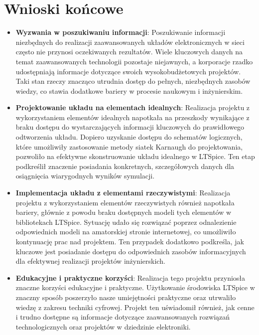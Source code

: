 \documentclass{article}
\begin{document}
\section{Wnioski końcowe}
\begin{itemize}
    \item \textbf{Wyzwania w poszukiwaniu informacji}:
    Poszukiwanie informacji niezbędnych do realizacji zaawansowanych układów elektronicznych w sieci często nie przynosi oczekiwanych rezultatów. Wiele kluczowych danych na temat zaawansowanych technologii pozostaje niejawnych, a korporacje rzadko udostępniają informacje dotyczące swoich wysokobudżetowych projektów. Taki stan rzeczy znacząco utrudnia dostęp do pełnych, niezbędnych zasobów wiedzy, co stawia dodatkowe bariery w procesie naukowym i inżynierskim.
    \item \textbf{Projektowanie układu na elementach idealnych}:
    Realizacja projektu z wykorzystaniem elementów idealnych napotkała na przeszkody wynikające z braku dostępu do wystarczających informacji kluczowych do prawidłowego odtworzenia układu. Dopiero uzyskanie dostępu do schematów logicznych, które umożliwiły zastosowanie metody siatek Karnaugh do projektowania, pozwoliło na efektywne skonstruowanie układu idealnego w LTSpice. Ten etap podkreślił znaczenie posiadania konkretnych, szczegółowych danych dla osiągnięcia wiarygodnych wyników symulacji.
    \item \textbf{Implementacja układu z elementami rzeczywistymi}:
    Realizacja projektu z wykorzystaniem elementów rzeczywistych również napotkała bariery, głównie z powodu braku dostępnych modeli tych elementów w bibliotekach LTSpice. Sytuację udało się rozwiązać poprzez odnalezienie odpowiednich modeli na amatorskiej stronie internetowej, co umożliwiło kontynuację prac nad projektem. Ten przypadek dodatkowo podkreśla, jak kluczowe jest posiadanie dostępu do odpowiednich zasobów informacyjnych dla efektywnej realizacji projektów inżynierskich.
    \item \textbf{Edukacyjne i praktyczne korzyści}:
    Realizacja tego projektu przyniosła znaczne korzyści edukacyjne i praktyczne. Użytkowanie środowiska LTSpice w znaczny sposób poszerzyło nasze umiejętności praktyczne oraz utrwaliło wiedzę z zakresu techniki cyfrowej. Projekt ten uświadomił również, jak cenne i trudno dostępne są informacje dotyczące zaawansowanych rozwiązań technologicznych oraz projektów w dziedzinie elektroniki.
\end{itemize}

\newpage
\end{document}
